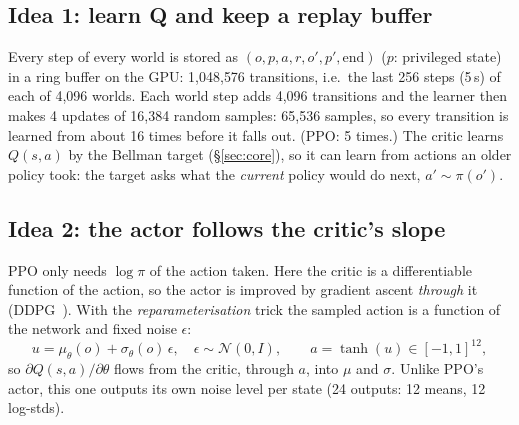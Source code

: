 \documentclass[10pt,letterpaper]{article}
\begin{document}
\subsection{Idea 1: learn Q and keep a replay buffer}
Every step of every world is stored as $(o,p,a,r,o',p',\text{end})$ ($p$: privileged state) in a ring buffer on the GPU:
1{,}048{,}576 transitions, i.e.\ the last 256 steps (5\,s) of each of 4{,}096 worlds. Each world step adds 4{,}096 transitions
and the learner then makes 4 updates of 16{,}384 random samples: 65{,}536 samples, so every transition is learned from about
16 times before it falls out. (PPO: 5 times.) The critic learns $Q(s,a)$ by the Bellman target (§\ref{sec:core}), so it can learn
from actions an older policy took: the target asks what the \emph{current} policy would do next, $a'\sim\pi(o')$.

\subsection{Idea 2: the actor follows the critic's slope}
PPO only needs $\log\pi$ of the action taken. Here the critic is a differentiable function of the action, so the actor is
improved by gradient ascent \emph{through} it (DDPG~\cite{lillicrap2016}). With the \emph{reparameterisation} trick the
sampled action is a function of the network and fixed noise $\epsilon$:
\[
u=\mu_\theta(o)+\sigma_\theta(o)\,\epsilon,\quad \epsilon\sim\mathcal{N}(0,I),\qquad a=\tanh(u)\in[-1,1]^{12},
\]
so $\partial Q(s,a)/\partial\theta$ flows from the critic, through $a$, into $\mu$ and $\sigma$. Unlike PPO's actor, this one
outputs its own noise level per state (24 outputs: 12 means, 12 log-stds).
\end{document}

